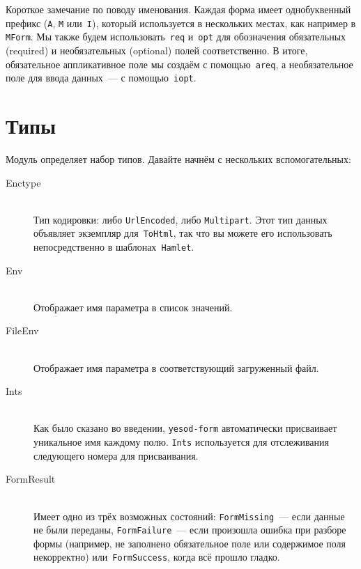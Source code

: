 Короткое замечание по поводу именования. Каждая форма имеет однобуквенный
префикс (\texttt{A}, \texttt{M} или~\texttt{I}), который используется в
нескольких местах, как например в \lstinline'MForm'. Мы также будем
использовать~\lstinline'req' и~\lstinline'opt' для обозначения обязательных
(required) и необязательных (optional) полей соответственно. В итоге,
обязательное аппликативное поле мы создаём с помощью~\lstinline'areq', а
необязательное поле для ввода данных~--- с помощью~\lstinline'iopt'.

\section{Типы}
Модуль
определяет набор типов. Давайте начнём с нескольких вспомогательных:

\begin{description}
    \item[Enctype] \hfill \\
        Тип кодировки: либо \lstinline'UrlEncoded', либо
        \lstinline'Multipart'. Этот тип данных объявляет экземпляр
        для~\lstinline'ToHtml', так что вы можете его использовать
        непосредственно в шаблонах~\texttt{Hamlet}.

    \item[Env] \hfill \\
        Отображает имя параметра в список значений.

    \item[FileEnv] \hfill \\
        Отображает имя параметра в соответствующий загруженный файл.

    \item[Ints] \hfill \\
        Как было сказано во введении, \texttt{yesod-form} автоматически
        присваивает уникальное имя каждому полю. \lstinline'Ints' используется
        для отслеживания следующего номера для присваивания.

    \item[FormResult] \hfill \\
        Имеет одно из трёх возможных состояний: \lstinline'FormMissing'~---
        если данные не были переданы, \lstinline'FormFailure'~--- если
        произошла ошибка при разборе формы (например, не заполнено
        обязательное поле или содержимое поля некорректно)
        или~\lstinline'FormSuccess', когда всё прошло гладко.
\end{description}

